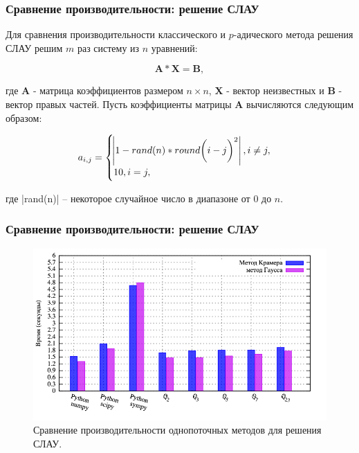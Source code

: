 \documentclass[10pt,professionalfont,utf8,presentation,compress]{beamer}
\theoremstyle{definition}
\theoremstyle{plain}
\begin{document}
\begin{frame}
\frametitle{Сравнение производительности: решение СЛАУ}
Для сравнения производительности классического и $p$-адического метода решения СЛАУ решим $m$ раз систему из $n$ уравнений:

\begin{equation}
\boldsymbol{A}*\boldsymbol{X}=\boldsymbol{B},
\end{equation}

\noindent где $\boldsymbol{A}$ - матрица коэффициентов размером $n \times n$, $\boldsymbol{X}$ - вектор неизвестных и $\boldsymbol{B}$ - вектор правых частей.
Пусть коэффициенты матрицы $\boldsymbol{A}$ вычисляются следующим образом:

\begin{equation}
a_{i,j}=
\begin{cases}
\abs{1-rand(n)*round\bigg(i-j\bigg)^2}, i \neq j, \\
10, i = j,
\end{cases}
\end{equation}

\noindent где |rand(n)| -- некоторое случайное число в диапазоне от $0$ до $n$.
\end{frame}


\begin{frame}
\frametitle{Сравнение производительности: решение СЛАУ}
\begin{figure}[H]
\centerline{\includegraphics[width=0.95\linewidth]{../gnuplot/single/system/plot.png}}
\caption{Сравнение производительности однопоточных методов для решения СЛАУ.}
\label{img:single:system:1}
\end{figure}
\end{frame}
\end{document}
